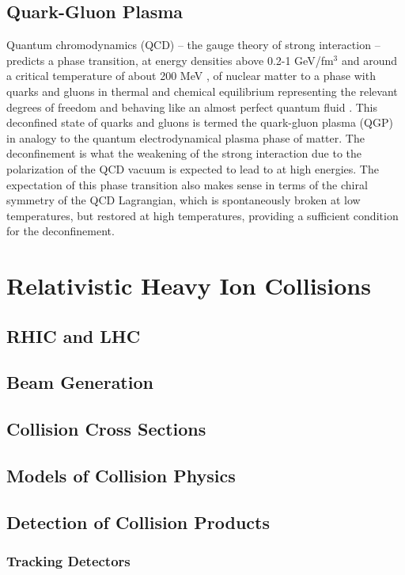 \subsection{Quark-Gluon Plasma}
Quantum chromodynamics (QCD) -- the gauge theory of strong interaction \cite{KAPUSTA1979461, Shuryak1988} -- predicts a phase transition, at energy densities above 0.2-1 GeV/fm$^{3}$ \cite{Adam:2139456} and around a critical temperature of about 200 MeV \cite{2013arXiv1304.1452M}, of nuclear matter to a phase with quarks and gluons in thermal and chemical equilibrium representing the relevant degrees of freedom and behaving like an almost perfect quantum fluid \cite{PhysRevLett.109.152303}. This deconfined state of quarks and gluons is termed the quark-gluon plasma (QGP) in analogy to the quantum electrodynamical plasma phase of matter. The deconfinement is what the weakening of the strong interaction due to the polarization of the QCD vacuum is expected to lead to at high energies. The expectation of this phase transition also makes sense in terms of the chiral symmetry of the QCD Lagrangian, which is spontaneously broken at low temperatures, but restored at high temperatures, providing a sufficient condition for the deconfinement.

\section{Relativistic Heavy Ion Collisions}

\subsection{RHIC and LHC}
\subsection{Beam Generation}
\subsection{Collision Cross Sections}
\subsection{Models of Collision Physics}
\subsection{Detection of Collision Products}
\subsubsection{Tracking Detectors}
